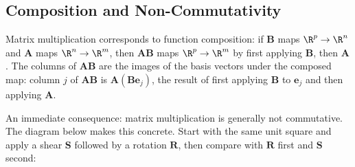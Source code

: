 \documentclass[main.tex]{subfiles}
\begin{document}
\subsection{Composition and Non-Commutativity}

Matrix multiplication corresponds to function composition: if $\mathbf{B}$ maps $\R^p \to \R^n$ and $\mathbf{A}$ maps $\R^n \to \R^m$, then $\mathbf{A}\mathbf{B}$ maps $\R^p \to \R^m$ by first applying $\mathbf{B}$, then $\mathbf{A}$. The columns of $\mathbf{A}\mathbf{B}$ are the images of the basis vectors under the composed map: column $j$ of $\mathbf{A}\mathbf{B}$ is $\mathbf{A}(\mathbf{B}\mathbf{e}_j)$, the result of first applying $\mathbf{B}$ to $\mathbf{e}_j$ and then applying $\mathbf{A}$.

An immediate consequence: matrix multiplication is generally not commutative. The diagram below makes this concrete. Start with the same unit square and apply a shear $\mathbf{S}$ followed by a rotation $\mathbf{R}$, then compare with $\mathbf{R}$ first and $\mathbf{S}$ second:
\end{document}
